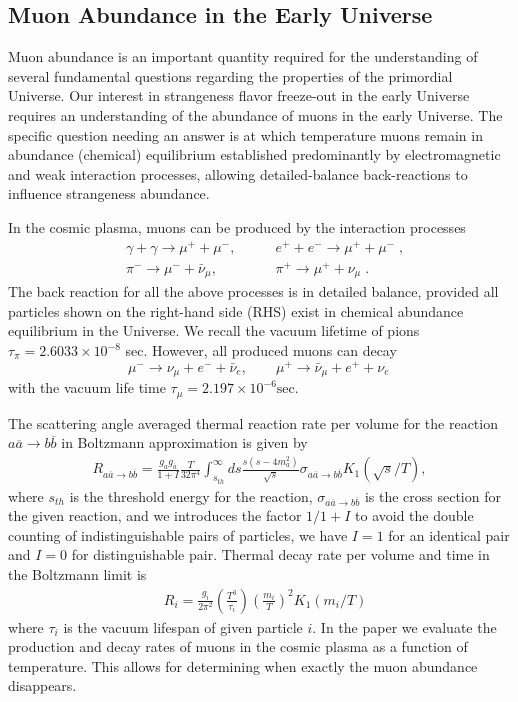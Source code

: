 \documentclass[universe,article,submit,moreauthors,pdftex,a4paper]{Definitions/mdpi}
\begin{document}
\subsection{Muon Abundance in the Early Universe} \label{sec:Muons}
\noindent Muon abundance is an important quantity required for the understanding of several fundamental questions regarding the properties of the primordial Universe. Our interest in strangeness flavor freeze-out in the early Universe \cite{Yang:2021bko} requires an understanding of the abundance of muons in the early Universe. The specific question needing an answer is at which temperature muons remain in abundance (chemical) equilibrium established predominantly by electromagnetic and weak interaction processes, allowing detailed-balance back-reactions to influence strangeness abundance.

In the cosmic plasma, muons can be produced by the interaction processes 
\begin{align} 
&\gamma+\gamma\longrightarrow\mu^++\mu^-,\qquad & e^++e^-\longrightarrow \mu^++\mu^-\;,\\
&\pi^-\longrightarrow\mu^-+\bar{\nu}_\mu,\qquad & \pi^+\longrightarrow\mu^++\nu_\mu\;.
\end{align}
The back reaction for all the above processes is in detailed balance, provided all particles shown on the right-hand side (RHS) exist in chemical abundance equilibrium in the Universe. We recall the vacuum lifetime of pions $\tau_\pi=2.6033\times10^{-8}$ sec. 
However, all produced muons can decay 
\begin{equation}
\mu^-\rightarrow\nu_\mu+e^-+\bar{\nu}_e,\qquad \mu^+\rightarrow\bar{\nu}_\mu+e^++\nu_e\,
\end{equation} 
with the vacuum life time $\tau_{\mu}=2.197 \times 10^{-6}\mathrm{sec}$. 

The scattering angle averaged thermal reaction rate per volume for the reaction $a\overline{a}\rightarrow b\overline{b}$ in Boltzmann approximation is given by \cite{Letessier:2002ony}
\begin{align}\label{pairR}
R_{a\overline{a}\rightarrow b\overline{b}}=\frac{g_ag_{\overline{a}}}{1+I}\frac{T}{32\pi^4}\int_{s_{th}}^\infty ds\frac{s(s-4m^2_a)}{\sqrt{s}}\sigma_{a\overline{a}\rightarrow b\overline{b}} K_1(\sqrt{s}/T),
\end{align}
where $s_{th}$ is the threshold energy for the reaction, $\sigma_{a\overline{a}\rightarrow b\overline{b}}$ is the cross section for the given reaction, and we introduces the factor $1/1+I$ to avoid the double counting of indistinguishable pairs of particles, we have $I=1$ for an identical pair and $I=0$ for distinguishable pair.
Thermal decay rate per volume and time in the Boltzmann limit is~\cite{Kuznetsova:2008jt}
\begin{align}
&R_i=\frac{g_i}{2\pi^2}\left(\frac{T^3}{\tau_i}\right)\left(\frac{m_i}{T}\right)^2K_1(m_i/T) 
\end{align}
where $\tau_i$ is the vacuum lifespan of given particle $i$. In the paper \cite{Rafelski:2021aey} we evaluate the production and decay rates of muons in the cosmic plasma as a function of temperature. This allows for determining when exactly the muon abundance disappears. 
\end{document}
